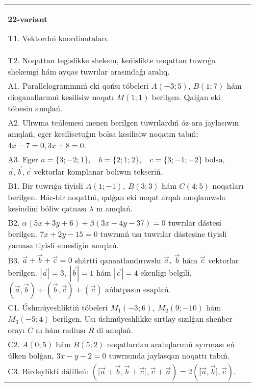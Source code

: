 \documentclass{article}
\begin{document}
\begin{tabular}{m{17cm}}
\textbf{22-variant}
\newline

T1. 
Vektordıń koordinataları.
 \\
T2. 
Noqattan tegislikke shekem, keńislikte noqattan tuwrıǵa shekemgi hám ayqas tuwrılar arasındaǵı aralıq. \\
A1. 
Parallelogrammnıń eki qońsı tóbeleri $A(-3;5)$, $B(1;7)$
hám dioganallarınıń kesilisiw noqatı $M(1;1)$ berilgen. Qalǵan eki
tóbesin anıqlań.
 \\
A2. 
Ulıwma teńlemesi menen berilgen tuwrılardıń      
óz-ara jaylasıwın anıqlań, eger kesilisetuǵın bolsa kesilisiw noqatın
tabıń: $4x-7=0, 3x+8=0$.
 \\
A3. 
Eger \(a = \{ 3; - 2;1\},\ \ \ \ b = \{ 2;1;2\},\ \ \ \ c = \{ 3; - 1; - 2\}\) bolsa, $\overrightarrow{a}, \overrightarrow{b}, \overrightarrow{c}$ vektorlar komplanar bolıwın tekseriń.
 \\
B1. 
Bir tuwrıǵa tiyisli \(A(1;-1),\ B(3;3)\) hám
\(C(4;5)\) noqatları berilgen. Hár-bir noqattıń, qalǵan eki noqat arqalı anıqlanıwshı kesindini bóliw qatnası $\lambda$ nı anıqlań.
 \\
B2. 
\(\alpha(5x+3y+6)+\beta(3x-4y-37)=0\) tuwrılar
dástesi berilgen. \(7x+2y-15=0\) tuwrınıń usı tuwrılar dástesine
tiyisli yamasa tiyisli emesligin anıqlań.
 \\
B3. 
$\vec{a} + \vec{b} + \vec{c} = 0$ shártti qanaatlandırıwshı $\vec{a},\ \vec{b}$ hám $\vec{c}$ vektorlar berilgen. $|\vec{a}| = 3,\ |\vec{b}| = 1$ hám $|\vec{c}| = 4$ ekenligi belgili, $\left(\vec{a},\vec{b} \right) + \left(\vec{b},\vec{c} \right) + (\vec{c})$ ańlatpasın esaplań.
 \\
C1. 
Úshmúyeshliktiń tóbeleri \(M_{1}( - 3;6),\ M_{2}(9; - 10)\) 
hám \(M_{3}( - 5;4)\) berilgen. Usı úshmúyeshlikke sırtlay sızılǵan
sheńber orayı $C$ nı hám radiusı $R$ di anıqlań.
 \\
C2. 
\(A(0;5)\) hám \(B(5;2)\) noqatlardan aralıqlarınıń
ayırması eń úlken bolǵan, \(3x - y - 2 = 0\) tuwrısında jaylasqan
noqattı tabıń.
 \\
C3. 
Birdeylikti dálilleń: \((\lbrack\vec{a} + \vec{b},\vec{b} + \vec{c}\rbrack,\vec{c} + \vec{a}) = 2 (\lbrack\vec{a},\vec{b}\rbrack,\vec{c}) \).
 \\

\end{tabular}
\vspace{1cm}
\end{document}
